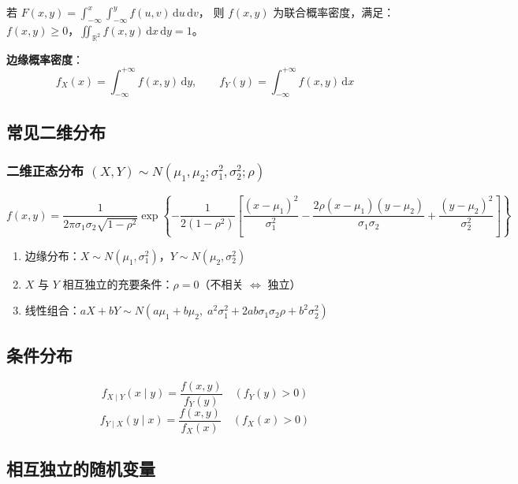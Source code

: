 \documentclass[12pt, a4paper]{article}
\newcommand{\dif}{\,\mathrm{d}}
\begin{document}
\begin{tcolorbox}[defbox, title={联合概率密度}]
    若 $\displaystyle F(x,y)=\int_{-\infty}^x\int_{-\infty}^y f(u,v)\dif u\dif v$，
    则 $f(x,y)$ 为联合概率密度，满足：
    $f(x,y)\ge 0$，$\displaystyle\iint_{\mathbb{R}^2}f(x,y)\dif x\dif y=1$。

    \textbf{边缘概率密度}：
    \[
        f_X(x)=\int_{-\infty}^{+\infty}f(x,y)\dif y, \qquad
        f_Y(y)=\int_{-\infty}^{+\infty}f(x,y)\dif x
    \]
\end{tcolorbox}

\subsection{常见二维分布}

\subsubsection{二维正态分布 $(X,Y)\sim N(\mu_1,\mu_2;\sigma_1^2,\sigma_2^2;\rho)$}

\[
    f(x,y)=\frac{1}{2\pi\sigma_1\sigma_2\sqrt{1-\rho^2}}
    \exp\!\left\{-\frac{1}{2(1-\rho^2)}
    \left[\frac{(x-\mu_1)^2}{\sigma_1^2}
        -\frac{2\rho(x-\mu_1)(y-\mu_2)}{\sigma_1\sigma_2}
        +\frac{(y-\mu_2)^2}{\sigma_2^2}\right]\right\}
\]

\begin{tcolorbox}[thmbox, title={二维正态分布的重要性质}]
    \begin{enumerate}
        \item 边缘分布：$X\sim N(\mu_1,\sigma_1^2)$，$Y\sim N(\mu_2,\sigma_2^2)$
        \item $X$ 与 $Y$ 相互独立的充要条件：$\rho=0$（不相关 $\iff$ 独立）
        \item 线性组合：$aX+bY\sim N(a\mu_1+b\mu_2,\;a^2\sigma_1^2+2ab\sigma_1\sigma_2\rho+b^2\sigma_2^2)$
    \end{enumerate}
\end{tcolorbox}

\subsection{条件分布}

\[
    f_{X\mid Y}(x\mid y) = \frac{f(x,y)}{f_Y(y)} \quad (f_Y(y)>0)
\]
\[
    f_{Y\mid X}(y\mid x) = \frac{f(x,y)}{f_X(x)} \quad (f_X(x)>0)
\]

\subsection{相互独立的随机变量}
\end{document}
